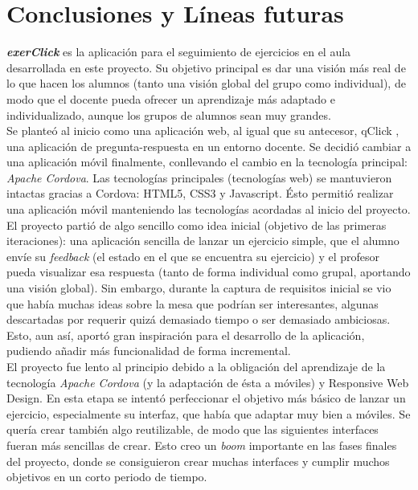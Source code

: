 
\pagestyle{fancy}

\chapter{Conclusiones y Líneas futuras}
\label{conclusiones}

\textit{\textbf{exerClick}} es la aplicación para el seguimiento de ejercicios en el aula desarrollada en este proyecto. Su objetivo principal es dar una visión más real de lo que hacen los alumnos (tanto una visión global del grupo como individual), de modo que el docente pueda ofrecer un aprendizaje más adaptado e individualizado, aunque los grupos de alumnos sean muy grandes.\\

Se planteó al inicio como una aplicación web, al igual que su antecesor, qClick \cite{qclick}, una aplicación de pregunta-respuesta en un entorno docente. Se decidió cambiar a una aplicación móvil finalmente, conllevando el cambio en la tecnología principal: \textit{Apache Cordova}. Las tecnologías principales (tecnologías web) se mantuvieron intactas gracias a Cordova: HTML5, CSS3 y Javascript. Ésto permitió realizar una aplicación móvil manteniendo las tecnologías acordadas al inicio del proyecto.\\

El proyecto partió de algo sencillo como idea inicial (objetivo de las primeras iteraciones): una aplicación sencilla de lanzar un ejercicio simple, que el alumno envíe su \textit{feedback} (el estado en el que se encuentra su ejercicio) y el profesor pueda visualizar esa respuesta (tanto de forma individual como grupal, aportando una visión global). Sin embargo, durante la captura de requisitos inicial se vio que había muchas ideas sobre la mesa que podrían ser interesantes, algunas descartadas por requerir quizá demasiado tiempo o ser demasiado ambiciosas. Esto, aun así, aportó gran inspiración para el desarrollo de la aplicación, pudiendo añadir más funcionalidad de forma incremental.\\

El proyecto fue lento al principio debido a la obligación del aprendizaje de la tecnología \textit{Apache Cordova} (y la adaptación de ésta a móviles) y Responsive Web Design. En esta etapa se intentó perfeccionar el objetivo más básico de lanzar un ejercicio, especialmente su interfaz, que había que adaptar muy bien a móviles. Se quería crear también algo reutilizable, de modo que las siguientes interfaces fueran más sencillas de crear. Esto creo un \textit{boom} importante en las fases finales del proyecto, donde se consiguieron crear muchas interfaces y cumplir muchos objetivos en un corto periodo de tiempo.\\

